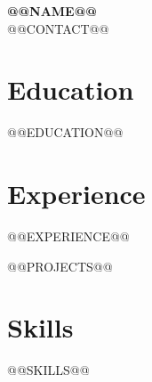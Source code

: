 \documentclass[10pt,letterpaper]{article}
\newcommand{\resumeHeader}[2]{%
  \begin{center}
    {\LARGE\bfseries #1}\\[3pt]
    {\small #2}
  \end{center}
  \vspace{-2pt}
}
\begin{document}
\resumeHeader{@@NAME@@}{@@CONTACT@@}

\section*{Education}
@@EDUCATION@@

\section*{Experience}
@@EXPERIENCE@@

@@PROJECTS@@

\section*{Skills}
@@SKILLS@@
\end{document}

